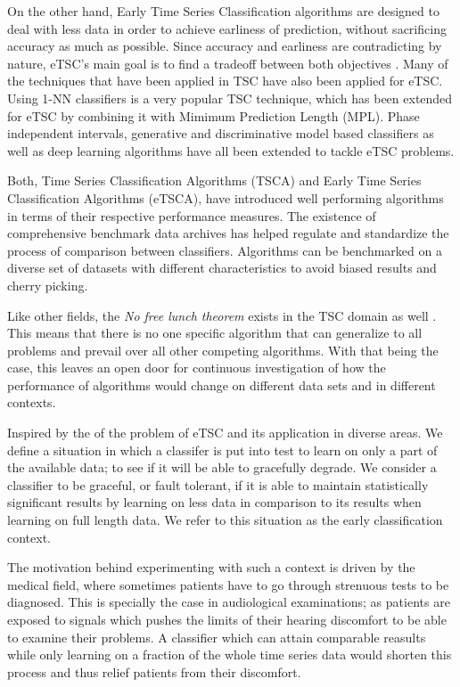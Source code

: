 On the other hand, Early Time Series Classification algorithms are designed to deal with less data in order to achieve earliness of prediction, without sacrificing accuracy as much as possible.
Since accuracy and earliness are contradicting by nature, eTSC's main goal is to find a tradeoff between both objectives \cite{gupta2020fault}.
Many of the techniques that have been applied in TSC have also been applied for eTSC.
Using 1-NN classifiers is a very popular TSC technique, which has been extended for eTSC by combining it with Mimimum Prediction Length (MPL)\cite{xing2012early}.
Phase independent intervals\cite{ghalwash2012early,he2015early}, generative and discriminative model based classifiers\cite{li2014early,cheng2018predicting} as well as deep learning algorithms \cite{huang2018multivariate, russwurm2019end}
have all been extended to tackle eTSC problems.


Both, Time Series Classification Algorithms (TSCA) and Early Time Series Classification Algorithms (eTSCA), have introduced well performing algorithms in terms of their respective performance measures.
The existence of comprehensive benchmark data archives \cite{UCRArchive2018,bagnall2018uea} has helped regulate and standardize the process of comparison between classifiers.
Algorithms can be benchmarked on a diverse set of datasets with different characteristics to avoid biased results and cherry picking.

Like other fields, the \emph{No free lunch theorem} exists in the TSC domain as well \cite{bagnall2017great,bostrom2018shapelet}.
This means that there is no one specific algorithm that can generalize to all problems and prevail over all other competing algorithms.
With that being the case, this leaves an open door for continuous investigation of how the performance of algorithms would change on different data sets and in different contexts.

Inspired by the of the problem of eTSC and its application in diverse areas.
We define a situation in which a classifer is put into test to learn on only a part of the available data; to see if it will be able to gracefully degrade.
We consider a classifier to be graceful, or fault tolerant, if it is able to maintain statistically significant results by learning on less data in comparison to its results when learning on full length data.
We refer to this situation as the early classification context.

The motivation behind experimenting with such a context is driven by the medical field, where sometimes patients have to go through strenuous tests to be diagnosed.
This is specially the case in audiological examinations; as patients are exposed to signals which pushes the limits of their hearing discomfort to be able to examine their problems.
A classifier which can attain comparable reasults while only learning on a fraction of the whole time series data would shorten this process and thus relief patients from their discomfort.

